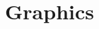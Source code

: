 \documentclass[aspectratio=169,utf8]{ctexbeamer}
\begin{document}
%
%
%
%
%
%
%


\section{Graphics}
\end{document}
